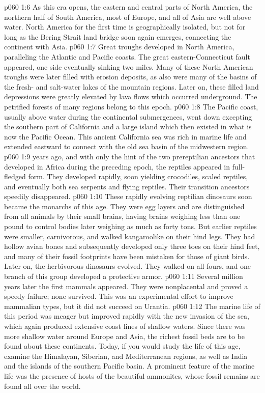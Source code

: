 \vs p060 1:6 As this era opens, the eastern and central parts of North America, the northern half of South America, most of Europe, and all of Asia are well above water. North America for the first time is geographically isolated, but not for long as the Bering Strait land bridge soon again emerges, connecting the continent with Asia.
\vs p060 1:7 Great troughs developed in North America, paralleling the Atlantic and Pacific coasts. The great eastern\hyp{}Connecticut fault appeared, one side eventually sinking two miles. Many of these North American troughs were later filled with erosion deposits, as also were many of the basins of the fresh\hyp{} and salt\hyp{}water lakes of the mountain regions. Later on, these filled land depressions were greatly elevated by lava flows which occurred underground. The petrified forests of many regions belong to this epoch.
\vs p060 1:8 The Pacific coast, usually above water during the continental submergences, went down excepting the southern part of California and a large island which then existed in what is now the Pacific Ocean. This ancient California sea was rich in marine life and extended eastward to connect with the old sea basin of the midwestern region.
\pc \vs p060 1:9  years ago,  and with only the hint of the two prereptilian ancestors that developed in Africa during the preceding epoch, the reptiles appeared in full\hyp{}fledged form. They developed rapidly, soon yielding crocodiles, scaled reptiles, and eventually both sea serpents and flying reptiles. Their transition ancestors speedily disappeared.
\vs p060 1:10 These rapidly evolving reptilian dinosaurs soon became the monarchs of this age. They were egg layers and are distinguished from all animals by their small brains, having brains weighing less than one pound to control bodies later weighing as much as forty tons. But earlier reptiles were smaller, carnivorous, and walked kangaroolike on their hind legs. They had hollow avian bones and subsequently developed only three toes on their hind feet, and many of their fossil footprints have been mistaken for those of giant birds. Later on, the herbivorous dinosaurs evolved. They walked on all fours, and one branch of this group developed a protective armor.
\vs p060 1:11 Several million years later the first mammals appeared. They were nonplacental and proved a speedy failure; none survived. This was an experimental effort to improve mammalian types, but it did not succeed on Urantia.
\vs p060 1:12 The marine life of this period was meager but improved rapidly with the new invasion of the sea, which again produced extensive coast lines of shallow waters. Since there was more shallow water around Europe and Asia, the richest fossil beds are to be found about these continents. Today, if you would study the life of this age, examine the Himalayan, Siberian, and Mediterranean regions, as well as India and the islands of the southern Pacific basin. A prominent feature of the marine life was the presence of hosts of the beautiful ammonites, whose fossil remains are found all over the world.
